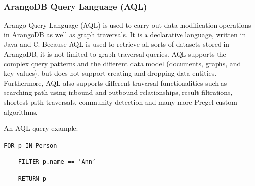 \subsubsection[ArangoDB Query Language (AQL)]{ArangoDB Query Language (\acrshort{AQL})} \label{subsubsection:LiteratureReview/ReviewofGraphDatabaseSystems/GraphQueryLanguages/ArangoDBQueryLanguageAQL}
Arango Query Language (\acrshort{AQL}) is used to carry out data modification operations in ArangoDB as well as graph
traversals.
It is a declarative language, written in Java and C.
Because \acrshort{AQL} is used to retrieve all sorts of datasets stored in ArangoDB, it is not limited to graph traversal queries.
\acrshort{AQL} supports the complex query patterns and the different data model (documents, graphs, and key-values). but does not support creating and dropping data entities.
Furthermore, \acrshort{AQL} also supports different traversal functionalities such as searching path using inbound and outbound relationships,
result filtrations, shortest path traversals, community detection and many more \gls{Pregel} custom algorithms.

An \acrshort{AQL} query example:

\noindent\colorbox{lightestgray}{
	\parbox{1\linewidth-9pt}{%
		\texttt{FOR p IN Person}
		
		\texttt{\ \ \ \ FILTER p.name == 'Ann'}
		
		\texttt{\ \ \ \ RETURN p}
	}%
}%

